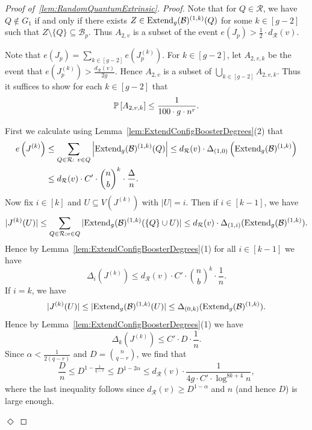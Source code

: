 \documentclass[11pt]{article}
\newcommand{\mc}[1]{\mathcal{#1}}
\newcounter{i}
\theoremstyle{plain}
\newenvironment{proofclaim}[1][]%
{\noindent \emph{Proof.} {}{#1}{}}{\hfill
	$\Diamond$\vspace{1em}}
\renewcommand{\theclaim}{\thetheorem.\arabic{claim}}
\newenvironment{lateproof}[1]
 {%
  \renewcommand{\theclaim}{\ref{#1}.\arabic{claim}}%
  \begin{proof}[Proof of~\cref{#1}]%
 }
 {\end{proof}}
\theoremstyle{plain} %
\theoremstyle{definition}
\newcommand{\Prob}[1]{\ensuremath{%
\mathbb P\left[#1\right]
}}
\begin{document}
\begin{lateproof}{lem:RandomQuantumExtrinsic}
\begin{proofclaim}
Note that for $Q\in \mc{R}$, we have $Q\not\in G_1$ if and only if there exists $Z\in{\rm Extend}_g(\mc{B})^{(1,k)}(Q)$ for some $k\in [g-2]$ such that $Z\setminus \{Q\}\subseteq \mc{B}_p$. Thus $A_{2,v}$ is a subset of the event $e(J_p) > \frac{1}{2}\cdot d_{\mc{R}}(v)$.

Note that $e(J_p) = \sum_{k\in [g-2]} e\left(J^{(k)}_p\right)$. For $k\in [g-2]$, let $A_{2,v,k}$ be the event that $e\left(J^{(k)}_p\right) > \frac{d_{\mc{R}}(v)}{2g}$. Hence $A_{2,v}$ is a subset of $\bigcup_{k \in [g-2]} A_{2,v,k}$. Thus it suffices to show for each  $k\in [g-2]$ that
$$\Prob{A_{2,v,k}} \le \frac{1}{100\cdot g \cdot n^r}.$$

First we calculate using Lemma~\ref{lem:ExtendConfigBoosterDegrees}(2) that
\begin{align*}
e\left(J^{(k)}\right) &\le \sum_{Q\in \mc{R}:~v\in Q} \left|{\rm Extend}_g(\mc{B})^{(1,k)}(Q)\right|\le d_{\mc{R}}(v) \cdot \Delta_{(1,0)}\left({\rm Extend}_g(\mc{B})^{(1,k)}\right) \\
&\le d_{\mc{R}}(v)\cdot C'\cdot \binom{n}{b}^k\cdot \frac{\Delta}{n}.
\end{align*}
Now fix $i\in [k]$ and $U\subseteq V(J^{(k)})$ with $|U|=i$. Then if $i\in [k-1]$, we have
$$|J^{(k)}(U)| \le \sum_{Q\in \mc{R}: v\in Q} |{\rm Extend}_g(\mc{B})^{(1,k)}(\{Q\}\cup U)| \le d_{\mc{R}}(v)\cdot 
\Delta_{(1,i)}({\rm Extend}_g(\mc{B})^{(1,k)}).$$
Hence by Lemma~\ref{lem:ExtendConfigBoosterDegrees}(1) for all $i\in [k-1]$ we have
$$\Delta_i\left(J^{(k)}\right) \le d_{\mc{R}}(v)\cdot C'\cdot \binom{n}{b}^k\cdot \frac{1}{n}.$$
If $i=k$, we have
$$|J^{(k)}(U)| \le |{\rm Extend}_g(\mc{B})^{(1,k)}(U)| \le 
\Delta_{(0,k)}({\rm Extend}_g(\mc{B})^{(1,k)}).$$
Hence by Lemma~\ref{lem:ExtendConfigBoosterDegrees}(1) we have
$$\Delta_k\left(J^{(k)}\right) \le C'\cdot D\cdot \frac{1}{n}.$$
Since $\alpha < \frac{1}{2(q-r)}$ and $D=\binom{n}{q-r}$, we find that
$$\frac{D}{n} \le D^{1-\frac{1}{q-r}} \le D^{1-2\alpha} \le d_{\mc{R}}(v)\cdot \frac{1}{4g\cdot C'\cdot \log^{8k+4} n},$$
where the last inequality follows since $d_{\mc{R}}(v) \ge D^{1-\alpha}$ and $n$ (and hence $D$) is large enough.


\end{proofclaim}
\end{lateproof}
\end{document}
